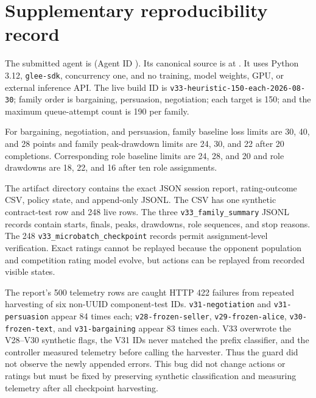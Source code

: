 \section{Supplementary reproducibility record}

The submitted agent is \AgentName{} (Agent ID \AgentID). Its canonical source
is 
at \CodeURL. It uses Python 3.12, \texttt{glee-sdk}, concurrency one, and no
training, model weights, GPU, or external inference API. The live build ID is
\texttt{v33-heuristic-150-each-2026-08-30}; family order is bargaining,
persuasion, negotiation; each target is 150; and the maximum queue-attempt count
is 190 per family.

For bargaining, negotiation, and persuasion, family baseline loss limits are
30, 40, and 28 points and family peak-drawdown limits are 24, 30, and 22 after
20 completions. Corresponding role baseline limits are 24, 28, and 20 and role
drawdowns are 18, 22, and 16 after ten role assignments.

The artifact directory contains the exact JSON session report, rating-outcome
CSV, policy state, and append-only JSONL. The CSV has one synthetic contract-test
row and 248 live rows. The three \texttt{v33\_family\_summary} JSONL records
contain starts, finals, peaks, drawdowns, role sequences, and stop reasons. The
248 \texttt{v33\_microbatch\_checkpoint} records permit assignment-level
verification. Exact ratings cannot be replayed because the opponent population
and competition rating model evolve, but actions can be replayed from recorded
visible states.

The report's 500 telemetry rows are caught HTTP 422 failures from repeated
harvesting of six non-UUID component-test IDs. \texttt{v31-negotiation} and
\texttt{v31-persuasion} appear 84 times each; \texttt{v28-frozen-seller},
\texttt{v29-frozen-alice}, \texttt{v30-frozen-text}, and
\texttt{v31-bargaining} appear 83 times each. V33 overwrote the V28--V30
synthetic flags, the V31 IDs never matched the prefix classifier, and the
controller measured telemetry before calling the harvester. Thus the guard did
not observe the newly appended errors. This bug did not change actions or
ratings but must be fixed by preserving synthetic classification and measuring
telemetry after all checkpoint harvesting.
